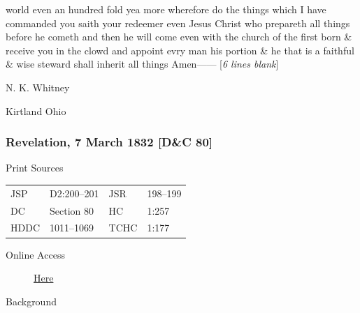 world even an hundred fold yea more wherefore do the things which I have commanded you saith your redeemer even Jesus Christ who prepareth all things before he cometh and then he will come even with the church of the first born \& receive you in the clowd and appoint evry man his portion \& he that is a faithful \& wise steward shall inherit all things Amen------ [\textit{6 lines blank}]
				
				\begin{tightcenter}
				N. K. Whitney
				
				Kirtland Ohio
				\end{tightcenter}
				
		\subsubsection{Revelation, 7 March 1832 [D\&C 80]}
			\label{EMS-1832-JS-7-MAR-1832}
		
			\begin{description}
				\item[Print Sources]
			\end{description}

				\begin{tabular}{p{0.5in}p{1in}p{0.5in}p{1in}}
				JSP	 	& D2:200--201	& JSR 		& 198--199 \\
				DC	 	& Section 80 	& HC 		& 1:257 \\
				HDDC 	& 1011--1069	& TCHC 		& 1:177 \\
				\end{tabular}
			
			\begin{description}
				\item[Online Access] \href{https://www.josephsmithpapers.org/paper-summary/revelation-7-march-1832-dc-80/1}{Here}
			\end{description}
			
			\begin{description}
				\item[Background]
			\end{description}
			
			
